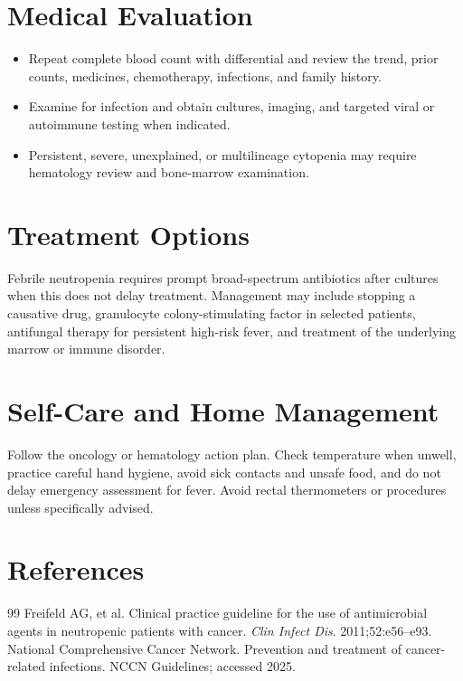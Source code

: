 \section*{Medical Evaluation}
\begin{itemize}
  \item Repeat complete blood count with differential and review the trend, prior counts, medicines, chemotherapy, infections, and family history.
  \item Examine for infection and obtain cultures, imaging, and targeted viral or autoimmune testing when indicated.
  \item Persistent, severe, unexplained, or multilineage cytopenia may require hematology review and bone-marrow examination.
\end{itemize}

\section*{Treatment Options}
Febrile neutropenia requires prompt broad-spectrum antibiotics after cultures when this does not delay treatment. Management may include stopping a causative drug, granulocyte colony-stimulating factor in selected patients, antifungal therapy for persistent high-risk fever, and treatment of the underlying marrow or immune disorder.

\section*{Self-Care and Home Management}
Follow the oncology or hematology action plan. Check temperature when unwell, practice careful hand hygiene, avoid sick contacts and unsafe food, and do not delay emergency assessment for fever. Avoid rectal thermometers or procedures unless specifically advised.

\section*{References}
\begin{thebibliography}{99}
 Freifeld AG, et al. Clinical practice guideline for the use of antimicrobial agents in neutropenic patients with cancer. \textit{Clin Infect Dis}. 2011;52:e56--e93.
 National Comprehensive Cancer Network. Prevention and treatment of cancer-related infections. NCCN Guidelines; accessed 2025.
\end{thebibliography}
